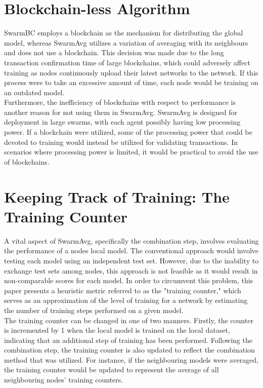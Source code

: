\section{Blockchain-less Algorithm}
SwarmBC employs a blockchain as the mechanism for distributing the global model, whereas SwarmAvg utilizes a variation of averaging with its neighbours and does not use a blockchain. This decision was made due to the long transaction confirmation time of large blockchains, which could adversely affect training as nodes continuously upload their latest networks to the network. If this process were to take an excessive amount of time, each node would be training on an outdated model. \\

Furthermore, the inefficiency of blockchains with respect to performance is another reason for not using them in SwarmAvg. SwarmAvg is designed for deployment in large swarms, with each agent possibly having low processing power. If a blockchain were utilized, some of the processing power that could be devoted to training would instead be utilized for validating transactions. In scenarios where processing power is limited, it would be practical to avoid the use of blockchains.

\section{Keeping Track of Training: The Training Counter}
A vital aspect of SwarmAvg, specifically the combination step, involves evaluating the performance of a nodes local model. The conventional approach would involve testing each model using an independent test set. However, due to the inability to exchange test sets among nodes, this approach is not feasible as it would result in non-comparable scores for each model. In order to circumvent this problem, this paper presents a heuristic metric referred to as the "training counter," which serves as an approximation of the level of training for a network by estimating the number of training steps performed on a given model. \\

The training counter can be changed in one of two manners. Firstly, the counter is incremented by 1 when the local model is trained on the local dataset, indicating that an additional step of training has been performed. Following the combination step, the training counter is also updated to reflect the combination method that was utilized. For instance, if the neighbouring models were averaged, the training counter would be updated to represent the average of all neighbouring nodes' training counters.

